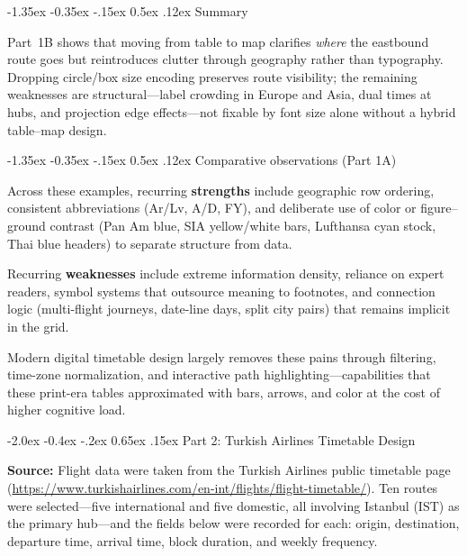 \documentclass[11pt]{article}
\makeatletter
\renewcommand\section{\@startsection{section}{1}{\z@}%
  {-2.0ex \@plus -0.4ex \@minus -.2ex}%
  {0.65ex \@plus .15ex}%
  {\normalfont\Large\bfseries}}
\renewcommand\subsection{\@startsection{subsection}{2}{\z@}%
  {-1.35ex \@plus -0.35ex \@minus -.15ex}%
  {0.5ex \@plus .12ex}%
  {\normalfont\large\bfseries}}
\makeatother
\begin{document}
\subsection{Summary}

Part~1B shows that moving from table to map clarifies \emph{where} the eastbound route goes but reintroduces clutter through geography rather than typography. Dropping circle/box size encoding preserves route visibility; the remaining weaknesses are structural---label crowding in Europe and Asia, dual times at hubs, and projection edge effects---not fixable by font size alone without a hybrid table--map design.

\subsection{Comparative observations (Part 1A)}

Across these examples, recurring \textbf{strengths} include geographic row ordering, consistent abbreviations (Ar/Lv, A/D, FY), and deliberate use of color or figure--ground contrast (Pan Am blue, SIA yellow/white bars, Lufthansa cyan stock, Thai blue headers) to separate structure from data.

Recurring \textbf{weaknesses} include extreme information density, reliance on expert readers, symbol systems that outsource meaning to footnotes, and connection logic (multi-flight journeys, date-line days, split city pairs) that remains implicit in the grid.

Modern digital timetable design largely removes these pains through filtering, time-zone normalization, and interactive path highlighting---capabilities that these print-era tables approximated with bars, arrows, and color at the cost of higher cognitive load.

\section{Part 2: Turkish Airlines Timetable Design}

\textbf{Source:} Flight data were taken from the Turkish Airlines public timetable page (\url{https://www.turkishairlines.com/en-int/flights/flight-timetable/}). Ten routes were selected---five international and five domestic, all involving Istanbul (IST) as the primary hub---and the fields below were recorded for each: origin, destination, departure time, arrival time, block duration, and weekly frequency.
\end{document}
